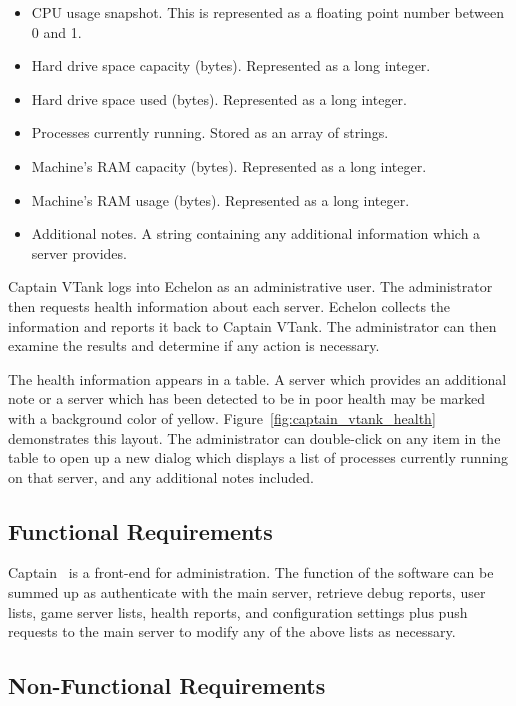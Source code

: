 \begin{itemize}
	\item CPU usage snapshot. This is represented as a floating point number between 0 and 1.
	\item Hard drive space capacity (bytes). Represented as a long integer.
	\item Hard drive space used (bytes). Represented as a long integer.
	\item Processes currently running. Stored as an array of strings.
	\item Machine's RAM capacity (bytes). Represented as a long integer.
	\item Machine's RAM usage (bytes). Represented as a long integer.
	\item Additional notes. A string containing any additional information which a server provides.
\end{itemize}

Captain VTank logs into Echelon as an administrative user. The administrator then requests health information about each server. Echelon collects the information and reports it back to Captain VTank. The administrator can then examine the results and determine if any action is necessary.

The health information appears in a table.  A server which provides an additional note or a server which has been detected to be in poor health may be marked with a background color of yellow. Figure~\ref{fig:captain_vtank_health} demonstrates this layout. The administrator can double-click on any item in the table to open up a new dialog which displays a list of processes currently running on that server, and any additional notes included.

\subsection{Functional Requirements}

Captain \VTank\ is a front-end for administration. The function of the software can be summed up as authenticate with the main server, retrieve debug reports, user lists, game server lists, health reports, and configuration settings plus push requests to the main server to modify any of the above lists as necessary.

\subsection{Non-Functional Requirements}

